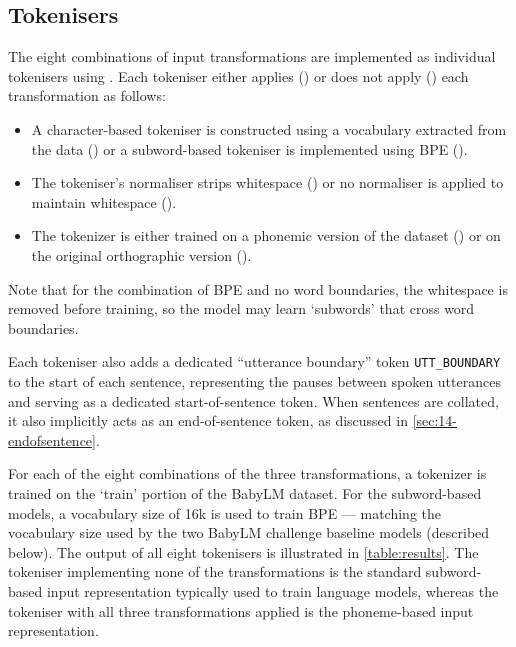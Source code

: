 \subsection{Tokenisers}\label{sec:14-tokenisers}

The eight combinations of input transformations are implemented as individual tokenisers using . Each tokeniser either applies (\cmark) or does not apply (\xmark) each transformation as follows:

\begin{itemize}
\setlength\itemsep{0.1em}
    \item {} A character-based tokeniser is constructed using a vocabulary extracted from the data (\cmark) or a subword-based tokeniser is implemented using BPE (\xmark).
    \item {} The tokeniser's normaliser strips whitespace (\cmark) or no normaliser is applied to maintain whitespace (\xmark).
    \item {} The tokenizer is either trained on a phonemic version of the dataset (\cmark) or on the original orthographic version (\xmark).
\end{itemize}

Note that for the combination of BPE and no word boundaries, the whitespace is removed before training, so the model may learn `subwords' that cross word boundaries.

Each tokeniser also adds a dedicated ``utterance boundary'' token \texttt{UTT\_BOUNDARY} to the start of each sentence, representing the pauses between spoken utterances and serving as a dedicated start-of-sentence token. When sentences are collated, it also implicitly acts as an end-of-sentence token, as discussed in \cref{sec:14-endofsentence}.

For each of the eight combinations of the three transformations, a tokenizer is trained on the `train' portion of the BabyLM dataset. For the subword-based models, a vocabulary size of 16k is used to train BPE --- matching the vocabulary size used by the two BabyLM challenge baseline models (described below). The output of all eight tokenisers is illustrated in \cref{table:results}. The tokeniser implementing none of the transformations is the standard subword-based input representation typically used to train language models, whereas the tokeniser with all three transformations applied is the phoneme-based input representation.


